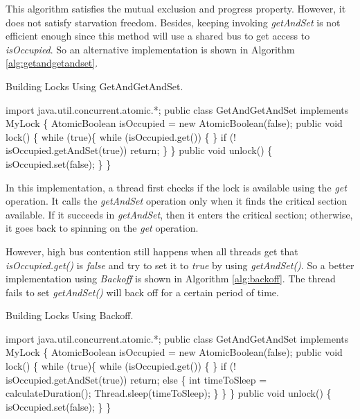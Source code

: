 \documentclass[twoside]{article}
\begin{document}
This algorithm satisfies the mutual exclusion and progress property. However, it does not satisfy starvation freedom.
Besides, keeping invoking \textit{getAndSet} is not efficient enough since this method will use a shared bus to get access to \textit{isOccupied}. So an alternative implementation is shown in Algorithm \ref{alg:getandgetandset}.

\begin{algorithm}
\caption{Building Locks Using GetAndGetAndSet.}
\begin{algorithmic}[1]
\State import java.util.concurrent.atomic.*;
\State public class GetAndGetAndSet implements MyLock \{
\State \indent AtomicBoolean isOccupied = new AtomicBoolean(false);
\State \indent public void lock() \{
\State \indent \indent while (true)\{
\State \indent \indent \indent while (isOccupied.get()) \{
\State \indent \indent \indent \}
\State \indent \indent \indent if (! isOccupied.getAndSet(true)) return;
\State \indent \indent \} 
\State \indent \}
\State \indent public void unlock() \{
\State \indent \indent isOccupied.set(false);
\State \indent \}
\State \}
\end{algorithmic}
\label{alg:getandgetandset}
\end{algorithm}

In this implementation, a thread first checks if the lock is available using the \textit{get} operation. It calls the \textit{getAndSet} operation only when it finds the critical section available. If it succeeds in \textit{getAndSet}, then it enters the critical section; otherwise, it goes back to spinning on the \textit{get} operation.

However, high bus contention still happens when all threads get that \textit{isOccupied.get()} is \textit{false} and try to set it to \textit{true} by using \textit{getAndSet()}. So a better implementation using \textit{Backoff} is shown in Algorithm \ref{alg:backoff}. The thread fails to set \textit{getAndSet()} will back off for a certain period of time. 

\begin{algorithm}
\caption{Building Locks Using Backoff.}
\begin{algorithmic}[1]
\State import java.util.concurrent.atomic.*;
\State public class GetAndGetAndSet implements MyLock \{
\State \indent AtomicBoolean isOccupied = new AtomicBoolean(false);
\State \indent public void lock() \{
\State \indent \indent while (true)\{
\State \indent \indent \indent while (isOccupied.get()) \{
\State \indent \indent \indent \}
\State \indent \indent \indent if (! isOccupied.getAndSet(true)) return;
\State \indent \indent \indent else \{
\State \indent \indent \indent \indent int timeToSleep = calculateDuration();
\State \indent \indent \indent \indent Thread.sleep(timeToSleep);
\State \indent \indent \indent \}
\State \indent \indent \} 
\State \indent \}
\State \indent public void unlock() \{
\State \indent \indent isOccupied.set(false);
\State \indent \}
\State \}
\end{algorithmic}
\label{alg:backoff}
\end{algorithm}
\end{document}
